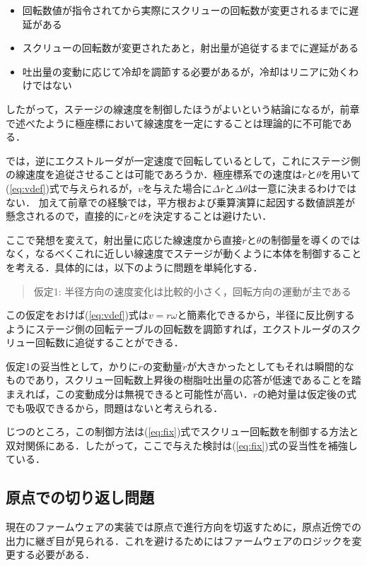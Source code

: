 \documentclass[twocolumn,oneside,a4paper]{article}
\begin{document}
\begin{itemize}
    \item 回転数値が指令されてから実際にスクリューの回転数が変更されるまでに遅延がある
    \item スクリューの回転数が変更されたあと，射出量が追従するまでに遅延がある
     \item 吐出量の変動に応じて冷却を調節する必要があるが，冷却はリニアに効くわけではない
\end{itemize}

したがって，ステージの線速度を制御したほうがよいという結論になるが，前章で述べたように極座標において線速度を一定にすることは理論的に不可能である．

では，逆にエクストルーダが一定速度で回転しているとして，これにステージ側の線速度を追従させることは可能であろうか．極座標系での速度は$r$と$\theta$を用いて(\ref{eq:vdef})式で与えられるが，$v$を与えた場合に$\Delta r$と$\Delta \theta$は一意に決まるわけではない．
加えて前章での経験では，平方根および乗算演算に起因する数値誤差が懸念されるので，直接的に$r$と$\theta$を決定することは避けたい．

ここで発想を変えて，射出量に応じた線速度から直接$r$と$\theta$の制御量を導くのではなく，なるべくこれに近しい線速度でステージが動くように本体を制御することを考える．具体的には，以下のように問題を単純化する．

\begin{quote}
     仮定1: 半径方向の速度変化は比較的小さく，回転方向の運動が主である
\end{quote}

この仮定をおけば(\ref{eq:vdef})式は$v=r \omega$と簡素化できるから，半径に反比例するようにステージ側の回転テーブルの回転数を調節すれば，エクストルーダのスクリュー回転数に追従することができる．

仮定1の妥当性として，かりに$r$の変動量$\dot{r}$が大きかったとしてもそれは瞬間的なものであり，スクリュー回転数上昇後の樹脂吐出量の応答が低速であることを踏まえれば，この変動成分は無視できると可能性が高い．$r$の絶対量は仮定後の式でも吸収できるから，問題はないと考えられる．

じつのところ，この制御方法は(\ref{eq:fix})式でスクリュー回転数を制御する方法と双対関係にある．したがって，ここで与えた検討は(\ref{eq:fix})式の妥当性を補強している．


\subsection{原点での切り返し問題}
現在のファームウェアの実装では原点で進行方向を切返すために，原点近傍での出力に継ぎ目が見られる．これを避けるためにはファームウェアのロジックを変更する必要がある．
\end{document}
